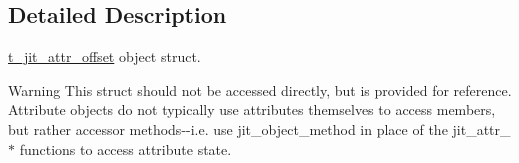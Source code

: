 \subsection{Detailed Description}
\hyperlink{structt__jit__attr__offset}{t\_\-jit\_\-attr\_\-offset} object struct. \begin{DoxyWarning}{Warning}
This struct should not be accessed directly, but is provided for reference. Attribute objects do not typically use attributes themselves to access members, but rather accessor methods-\/-\/i.e. use jit\_\-object\_\-method in place of the jit\_\-attr\_\-$\ast$ functions to access attribute state. 
\end{DoxyWarning}
